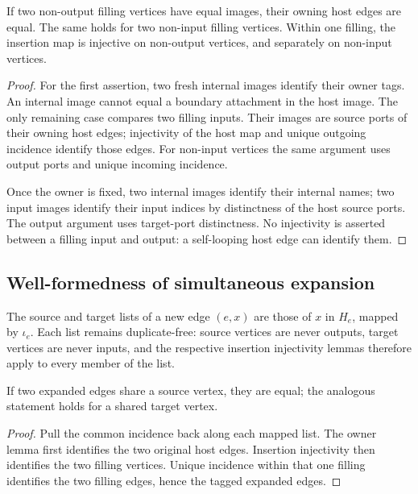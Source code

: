 \begin{lemma}
If two non-output filling vertices have equal images, their owning host
edges are equal. The same holds for two non-input filling vertices.
Within one filling, the insertion map is injective on non-output vertices,
and separately on non-input vertices.
\end{lemma}
\begin{proof}
For the first assertion, two fresh internal images identify their owner tags.
An internal image cannot equal a boundary attachment in the host image.
The only remaining case compares two filling inputs. Their images are
source ports of their owning host edges; injectivity of the host map and
unique outgoing incidence identify those edges. For non-input vertices the
same argument uses output ports and unique incoming incidence.

Once the owner is fixed, two internal images identify their internal names;
two input images identify their input indices by distinctness of the host
source ports. The output argument uses target-port distinctness. No
injectivity is asserted between a filling input and output: a self-looping
host edge can identify them.
\end{proof}

\subsection{Well-formedness of simultaneous expansion}
The source and target lists of a new edge $(e,x)$ are those of $x$ in $H_e$,
mapped by $\iota_e$. Each list remains duplicate-free: source vertices are
never outputs, target vertices are never inputs, and the respective
insertion injectivity lemmas therefore apply to every member of the list.

\begin{lemma}
If two expanded edges share a source vertex, they are equal; the analogous
statement holds for a shared target vertex.
\end{lemma}
\begin{proof}
Pull the common incidence back along each mapped list. The owner lemma first
identifies the two original host edges. Insertion injectivity then identifies
the two filling vertices. Unique incidence within that one filling identifies
the two filling edges, hence the tagged expanded edges.
\end{proof}

